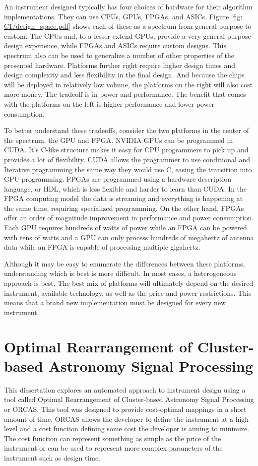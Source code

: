 An instrument designed typically has four choices of hardware for their algorithm implementations. 
They can use CPUs, GPUs, FPGAs, and ASICs.
Figure \ref{fig: C1/design_space.pdf} shows each of these as a spectrum from general purpose to custom.
The CPUs and, to a lesser extend GPUs, provide a very general purpose design experience, while FPGAs and ASICs require custom designs.
This spectrum also can be used to generalize a number of other properties of the presented hardware.
Platforms further right require higher design times and design complexity and less flexibility in the final design.
And because the chips will be deployed in relatively low volume, the platforms on the right will also cost more money. 
The tradeoff is in power and performance. 
The benefit that comes with the platforms on the left is higher performance and lower power consumption. 

To better understand these tradeoffs, consider the two platforms in the center of the spectrum, the GPU and FPGA.
NVIDIA GPUs can be programmed in CUDA.
It's C-like structure makes it easy for CPU programmers to pick up and provides a lot of flexibility. 
CUDA allows the programmer to use conditional and Iterative programming the same way they would use C, easing the transition into GPU programming.
FPGAs are programmed using a hardware description language, or HDL, which is less flexible and harder to learn than CUDA.
In the FPGA computing model the data is streaming and everything is happening at the same time, requiring specialized programming.
On the other hand, FPGAs offer an order of magnitude improvement in performance and power consumption.
Each GPU requires hundreds of watts of power while an FPGA can be powered with tens of watts and a GPU can only process hundreds of megahertz of antenna data while an FPGA is capable of processing multiple gigahertz.

Although it may be easy to enumerate the differences between these platforms, understanding which is best is more difficult.
In most cases, a heterogeneous approach is best, 
The best mix of platforms will ultimately depend on the desired instrument, available technology, as well as the price and power restrictions.
This means that a brand new implementation must be designed for every new instrument.


\section{Optimal Rearrangement of Cluster-based Astronomy Signal Processing}
This dissertation explores an automated approach to instrument design using a tool called Optimal Rearrangement of Cluster-based Astronomy Signal Processing or ORCAS.
This tool was designed to provide cost-optimal mappings in a short amount of time.
ORCAS allows the developer to define the instrument at a high level and a cost function defining some cost the developer is aiming to minimize.
The cost function can represent something as simple as the price of the instrument or can be used to represent more complex parameters of the instrument such as design time.


